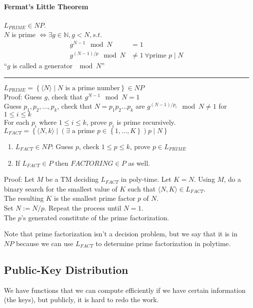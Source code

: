 \documentclass[12 pt]{article}
\begin{document}
\paragraph{Fermat's Little Theorem}
$L_{PRIME} \in NP$.
\\ $N$ is prime $\iff \exists g \in \mathbb{N}, g < N, s.t.$
\begin{align*}
  g^{N-1}\mod N & = 1
  \\ g^{(N-1)/p} \mod N & \neq 1\ \forall \text{prime } p \mid N
\end{align*}
``$g$ is called a generator $\mod N$''
\\ \noindent \rule{\textwidth}{0.5pt}
$L_{PRIME} = \left\{\langle N \rangle \mid N \text{ is a prime
    number}\right\} \in NP$
\\ Proof: Guess $g$, check that $g^{N-1} \mod N = 1$
\\ Guess $p_1, p_2, \ldots, p_k$, check that $N = p_1 p_2 \ldots p_k$
are $g^{(N-1)/p_i}\mod N \neq 1$ for $1 \leq i \leq k$
\\ For each $p_i$ where $1 \leq i \leq k$, prove $p_i$ is prime
recursively.
\\ $L_{FACT} = \left\{\langle N,k \rangle \mid (\exists \text{ a prime
  } p \in \left\{1, \ldots, K\right\}) p \mid N\right\}$
\begin{enumerate}
\item $L_{FACT} \in NP$: Guess $p$, check $1 \leq p \leq k$, prove $p
  \in L_{PRIME}$
\item If $L_{FACT} \in P$ then $FACTORING \in P$ as well.
\end{enumerate}
Proof: Let $M$ be a TM deciding $L_{FACT}$ in poly-time. Let $K =
N$. Using $M$, do a binary search for the smallest value of $K$ such
that $\langle N,K \rangle \in L_{FACT}$.
\\ The resulting $K$ is the smallest prime factor $p$ of $N$.
\\ Set $N := N/p$. Repeat the process until $N = 1$.
\\ The $p$'s generated constitute of the prime factorization.

Note that prime factorization isn't a decision problem, but we say
that it is in $NP$ because we can use $L_{FACT}$ to determine prime
factorization in polytime.
\subsection{Public-Key Distribution}
We have functions that we can compute efficiently if we have certain
information (the keys), but publicly, it is hard to redo the work.
\end{document}
